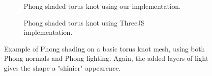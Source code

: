 \documentclass[10pt,twocolumn,letterpaper]{article}
\begin{document}
\begin{figure}
    \centering
    \begin{subfigure}{.48\linewidth}
        \caption{Phong shaded torus knot using our implementation.}
        \label{fig:our-phong-tk}
    \end{subfigure}
    \hfill
    \begin{subfigure}{.48\linewidth}
        \caption{Phong shaded torus knot using ThreeJS implementation.}
        \label{fig:three-phong-tk}
    \end{subfigure}
    \caption{Example of Phong shading on a basic torus knot mesh, using both Phong normals and Phong lighting. Again, the added layers of light gives the shape a "shinier" appearence.}
    \label{fig:phong-tk}
\end{figure}

\end{document}
